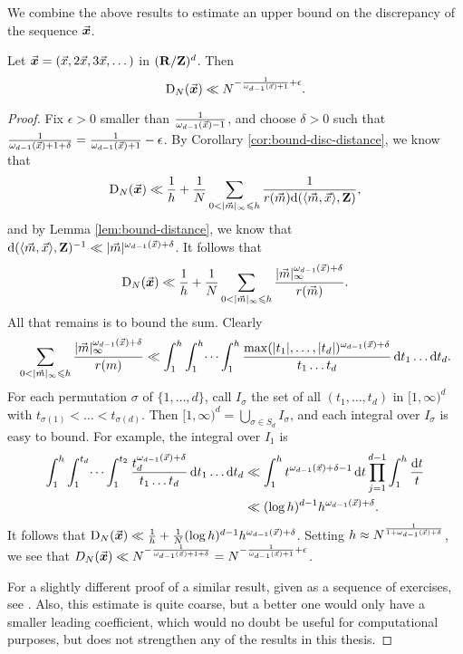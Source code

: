 We combine the above results to estimate an upper bound on the discrepancy of 
the sequence $\vec{\boldsymbol x}$. 

\begin{theorem}\label{thm:disc-upper-bound}
Let $\vec{\boldsymbol x}=(\vec{x},2\vec{x},3\vec{x},\dots)$ in $(\mathbf{R}/\mathbf{Z})^d$. Then 
\[
	\operatorname{D}_N(\vec{\boldsymbol x}) \ll N^{-\frac{1}{\omega_{d-1}(\vec{x})+1}+\epsilon} .
\]
\end{theorem}
\begin{proof}
Fix $\epsilon>0$ smaller than $\frac{1}{\omega_{d-1}(\vec{x}) - 1}$, and choose 
$\delta>0$ such that 
$\frac{1}{\omega_{d-1}(\vec{x})+1+\delta} = \frac{1}{\omega_{d-1}(\vec{x})+1} - \epsilon$. 
By Corollary \ref{cor:bound-disc-distance}, we know that 
\[
	\D_N(\bvx) \ll \frac 1 h + \frac 1 N \sum_{0<|\vm|_\infty \leqslant h} \frac{1}{r(\vm) \dd(\langle \vm,\vx\rangle,\bZ)} ,
\]
and by Lemma \ref{lem:bound-distance}, we know that 
$\mathrm{d}(\langle \vec{m},\vec{x}\rangle,\mathbf{Z})^{-1} \ll |\vec{m}|^{\omega_{d-1}(\vec{x})+\delta}$. 
It follows that 
\[
	\operatorname{D}_N(\vec{\boldsymbol x}) \ll \frac 1 h + \frac 1 N \sum_{0 < |\vec{m}|_\infty \leqslant h} \frac{|\vec{m}|_\infty^{\omega_{d-1}(\vec{x})+\delta}}{r(\vec{m})} .
\]
All that remains is to bound the sum. Clearly 
\[
	\sum_{0 < |\vec{m}|_\infty \leqslant h} \frac{|\vec{m}|_\infty^{\omega_{d-1}(\vec{x}) + \delta}}{r(m)} \ll \int_1^h \int_1^h \dots \int_1^h \frac{\max(|t_1|,\dots,|t_d|)^{\omega_{d-1}(\vec{x})+\delta}}{t_1 \dots t_d}\, \mathrm{d} t_1 \dots \mathrm{d} t_d .
\]
For each permutation $\sigma$ of $\{1,\dots,d\}$, call $I_\sigma$ the set of 
all $(t_1,\dots,t_d)$ in $[1,\infty)^d$ with 
$t_{\sigma(1)} < \dots < t_{\sigma(d)}$. Then 
$[1,\infty)^d = \bigcup_{\sigma\in S_d} I_\sigma$, and each integral over 
$I_\sigma$ is easy to bound. For example, the integral over $I_1$ is 
\begin{align*}
	\int_1^h \int_1^{t_d} \dots \int_1^{t_2} \frac{t_d^{\omega_{d-1}(\vec{x})+\delta}}{t_1 \dots t_d}\, \mathrm{d} t_1 \dots \mathrm{d} t_d 
		&\ll \int_1^h t^{\omega_{d-1}(\vec{x})+\delta-1}\, \mathrm{d} t \prod_{j=1}^{d-1} \int_1^h \frac{\mathrm{d} t}{t} \\
		&\ll (\log h)^{d-1} h^{\omega_{d-1}(\vec{x})+\delta} .
\end{align*}
It follows that 
$\operatorname{D}_N(\vec{\boldsymbol x}) \ll \frac 1 h + \frac 1 N (\log h)^{d-1} h^{\omega_{d-1}(\vec{x})+\delta}$. 
Setting $h\approx N^{\frac{1}{1+\omega_{d-1}(\vec{x})+\delta}}$, we see that 
$D_N(\vec{\boldsymbol x}) \ll N^{-\frac{1}{\omega_{d-1}(\vec{x})+1+\delta}} = N^{-\frac{1}{\omega_{d-1}(\vec{x})+1} + \epsilon}$. 

For a slightly different proof of a similar result, given as a sequence of 
exercises, see  \cite[Ch.~2, Ex.~3.15, 16, 17]{kuipers-niederreiter-1974}. 
Also, this estimate is quite coarse, but a better one would only have a smaller 
leading coefficient, which would no doubt be useful for computational 
purposes, but does not strengthen any of the results in this thesis.  
\end{proof}

